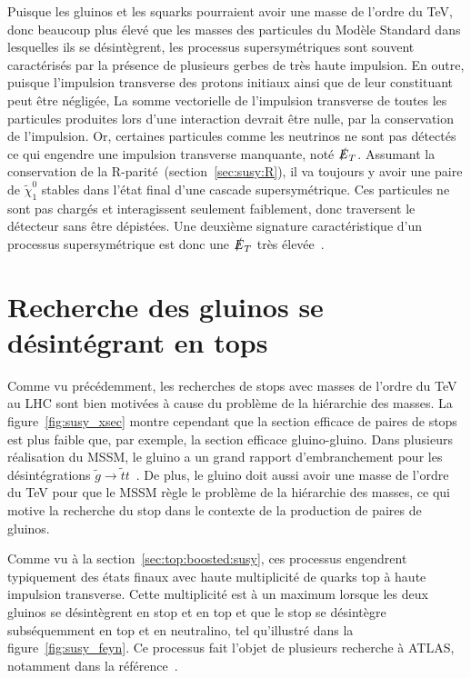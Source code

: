 Puisque les gluinos et les squarks pourraient avoir une masse de
l'ordre du TeV, donc beaucoup plus élevé que les masses des particules
du Modèle Standard dans lesquelles ils se désintègrent, les processus
supersymétriques sont souvent caractérisés par la présence de
plusieurs gerbes de très haute impulsion. En outre, puisque
l'impulsion transverse des protons initiaux ainsi que de leur
constituant peut être négligée, La somme vectorielle de l'impulsion
transverse de toutes les particules produites lors d'une interaction
devrait être nulle, par la conservation de l'impulsion. Or, certaines
particules comme les neutrinos ne sont pas détectés ce qui engendre
une impulsion transverse manquante, noté $\slashed{E}_T$. Assumant la
conservation de la R-parité~(section~\ref{sec:susy:R}), il va toujours
y avoir une paire de $\tilde{\chi}_1^0$ stables dans l'état final d'une
cascade supersymétrique. Ces particules ne sont pas chargés et
interagissent seulement faiblement, donc traversent le détecteur sans
être dépistées. Une deuxième signature caractéristique d'un processus
supersymétrique est donc une $\slashed{E}_T$ très
élevée~\cite{olive_susy2_2014}.


\section{Recherche des gluinos se désintégrant en tops}
\label{sec:susy_atlas:gtt}

Comme vu précédemment, les recherches de stops avec masses de l'ordre
du TeV au LHC sont bien motivées à cause du problème de la hiérarchie
des masses. La figure~\ref{fig:susy_xsec} montre cependant que la
section efficace de paires de stops est plus faible que, par exemple,
la section efficace gluino-gluino. Dans plusieurs réalisation du MSSM,
le gluino a un grand rapport d'embranchement pour les désintégrations
$\tilde{g} \rightarrow \tilde{t} t$~\cite{bandyopadhyay_boosted_2011}.
De plus, le gluino doit aussi avoir une masse de l'ordre du TeV pour
que le MSSM règle le problème de la hiérarchie des masses, ce qui
motive la recherche du stop dans le contexte de la production de
paires de gluinos.

Comme vu à la section~\ref{sec:top:boosted:susy}, ces processus
engendrent typiquement des états finaux avec haute multiplicité de
quarks top à haute impulsion transverse. Cette multiplicité est à un
maximum lorsque les deux gluinos se désintègrent en stop et en top et
que le stop se désintègre subséquemment en top et en neutralino, tel
qu'illustré dans la figure~\ref{fig:susy_feyn}. Ce processus fait l'objet
de plusieurs recherche à ATLAS, notamment dans la référence~\cite{ATLAS-CONF-2015-067}.

